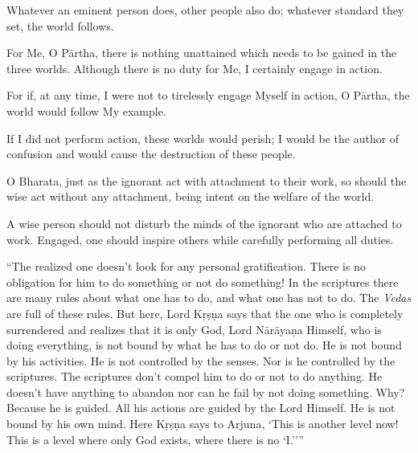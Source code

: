 {Whatever an eminent person does, other people also do; whatever standard they set, the world follows.}

{For Me, O Pārtha, there is nothing unattained which needs to be gained in the three worlds. Although there is no duty for Me, I certainly engage in action.}

{For if, at any time, I were not to tirelessly engage Myself in action, O Pārtha, the world would follow My example.}

{If I did not perform action, these worlds would perish; I would be the author of confusion and would cause the destruction of these people.}

{O Bharata, just as the ignorant act with attachment to their work, so should the wise act without any attachment, being intent on the welfare of the world.}

{A wise person should not disturb the minds of the ignorant who are attached to work. Engaged, one should inspire others while carefully performing all duties.}

\enquote{The realized one doesn’t look for any personal gratification. There is no obligation for him to do something or not do something! In the scriptures there are many rules about what one has to do, and what one has not to do. The \textit{Vedas} are full of these rules. But here, Lord Kṛṣṇa says that the one who is completely surrendered and realizes that it is only God, Lord Nārāyaṇa Himself, who is doing everything, is not bound by what he has to do or not do. He is not bound by his activities. He is not controlled by the senses. Nor is he controlled by the scriptures. The scriptures don’t compel him to do or not to do anything. He doesn’t have anything to abandon nor can he fail by not doing something. Why? Because he is guided. All his actions are guided by the Lord Himself. He is not bound by his own mind. Here Kṛṣṇa says to Arjuna, \enquote{This is another level now! This is a level where only God exists, where there is no ‘I.’}}

